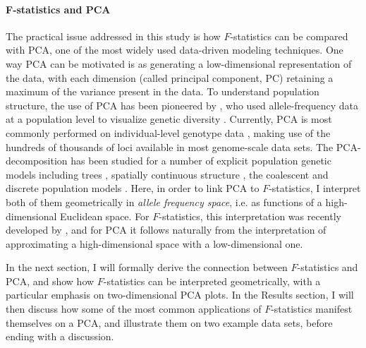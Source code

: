 \documentclass[12pt,fullpage, a4paper]{article}
\begin{document}
\paragraph{F-statistics and PCA}
The practical issue addressed in this study is how $F$-statistics can be compared with PCA, one of the most widely used data-driven modeling  techniques. One way PCA can be motivated is as generating a low-dimensional representation of the data, with each dimension (called principal component, PC) retaining a maximum of the variance present in the data. To understand population structure, the use of PCA has been pioneered by \cite{cavalli-sforza1964}, who used allele-frequency data at a population level to visualize genetic diversity \citep{cavalli-sforza1994}. Currently, PCA is most commonly performed on individual-level genotype data \citep[e.g.][]{patterson2006, novembre2008}, making use of the hundreds of thousands of loci available in most genome-scale data sets. 
The PCA-decomposition has been studied for a number of explicit population genetic models including trees \citep{cavalli-sforza1975}, spatially continuous structure \citep{novembre2008a}, the coalescent \citep{mcvean2009} and discrete population models \citep{francois2021}. Here, in order to link PCA to $F$-statistics, I interpret both of them geometrically in \emph{allele frequency space}, i.e. as functions of a high-dimensional Euclidean space. For $F$-statistics, this interpretation was recently developed by \cite{oteo-garcia2021}, and for PCA it follows naturally from the interpretation of approximating a high-dimensional space with a low-dimensional one.

In the next section, I will formally derive the connection between $F$-statistics and PCA, and show how $F$-statistics can be interpreted geometrically, with a particular emphasis on two-dimensional PCA plots. In the Results section, I will then discuss how some of the most common applications of $F$-statistics manifest themselves on a PCA, and illustrate them on two example data sets, before ending with a discussion.
\end{document}
